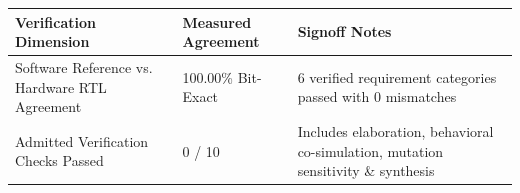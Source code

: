 \documentclass[11pt,a4paper]{article}
\begin{document}
{\small\renewcommand{\arraystretch}{1.18}\begin{longtable}{@{}L{0.38\textwidth}|L{0.22\textwidth}|L{0.32\textwidth}@{}}\toprule

\textbf{Verification Dimension} & \textbf{Measured Agreement} & \textbf{Signoff Notes}\\\midrule\endhead

Software Reference vs. Hardware RTL Agreement & 100.00\% Bit-Exact & 6 verified requirement categories passed with 0 mismatches\\[2pt]\hline

Admitted Verification Checks Passed & 0 /\allowbreak{} 10 & Includes elaboration,\allowbreak{} behavioral co-simulation,\allowbreak{} mutation sensitivity \& synthesis\\[2pt]\hline

\bottomrule\end{longtable}}
\end{document}
